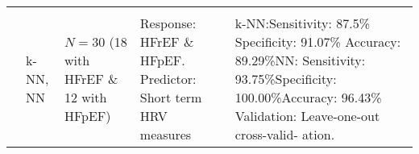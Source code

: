 \begin{footnotesize}
\begin{tabularx}{\textwidth}{Lp{1cm}LLp{3cm}}
&\\
\cite{isler2016discrimination} & k-NN, NN & $N=30$ (18 with HFrEF \& 12 with HFpEF) & Response: HFrEF \& HFpEF. Predictor: Short term HRV measures & k-NN:\newline Sensitivity: 87.5\% \newline Specificity: 91.07\% \newline Accuracy: 89.29\%\newline NN: \newline Sensitivity: 93.75\%\newline Specificity: 100.00\%\newline Accuracy: 96.43\% \newline \newline Validation: Leave-one-out cross-valid- ation.\\
\midrule
\end{tabularx}
\end{footnotesize}